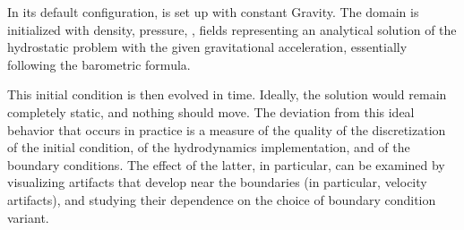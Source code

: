 In its default configuration,  is set up with constant \unit{Gravity}.
The domain is initialized with density, pressure, \etc, fields representing
an analytical solution of the hydrostatic problem with the given
gravitational acceleration, essentially following the
barometric formula.

This initial condition is then evolved in time.  Ideally, the solution would remain
completely static, and nothing should move.  The deviation from this ideal
behavior that occurs in practice is a measure of the quality of the discretization of
the initial condition, of the hydrodynamics implementation, and of the boundary
conditions.  The effect of the latter, in particular, can be examined by
visualizing artifacts that develop near the boundaries (in particular, velocity
artifacts), and studying their dependence on the choice of boundary condition variant.

